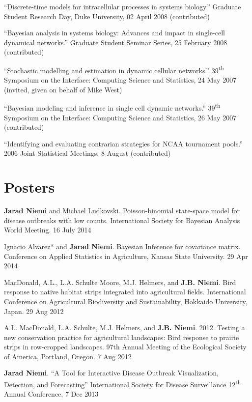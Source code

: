 \documentclass[overlapped,line]{res}
\begin{document}
\begin{resume}
{``Discrete-time models for intracellular processes in systems biology.'' Graduate Student Research Day, Duke University, 02 April 2008 (contributed)

``Bayesian analysis in systems biology: Advances and impact in single-cell dynamical networks.'' Graduate Student Seminar Series, 25 February 2008 (contributed)

``Stochastic modelling and estimation in dynamic cellular networks.'' 39\textsuperscript{th} Symposium on the Interface: Computing Science and Statistics, 24 May 2007 (invited, given on behalf of Mike West)

``Bayesian modeling and inference in single cell dynamic networks.'' 39\textsuperscript{th} Symposium on the Interface: Computing Science and Statistics, 26 May 2007 (contributed)


``Identifying and evaluating contrarian strategies for NCAA tournament pools.'' 2006 Joint Statistical Meetings, 8 August (contributed)

}


\section{\bf Posters}

{\small

{\bf Jarad Niemi} and Michael Ludkovski. Poisson-binomial state-space model for disease outbreaks with low counts. International Society for Bayesian Analysis World Meeting. 16 July 2014 

Ignacio Alvarez* and {\bf Jarad Niemi}. Bayesian Inference for covariance matrix. Conference on Applied Statistics in Agriculture, Kansas State University. 29 Apr 2014 

MacDonald, A.L., L.A. Schulte Moore, M.J. Helmers, and {\bf J.B. Niemi}.  Bird response to native habitat strips integrated into agricultural fields.  International Conference on Agricultural Biodiversity and Sustainability, Hokkaido University, Japan.  29 Aug 2012 

A.L. MacDonald, L.A. Schulte, M.J. Helmers, and {\bf J.B. Niemi}.  2012.  Testing a new conservation practice for agricultural landscapes: Bird response to prairie strips in row-cropped landscapes.  97th Annual Meeting of the Ecological Society of America, Portland, Oregon. 7 Aug 2012 

{\bf Jarad Niemi}. ``A Tool for Interactive Disease Outbreak Visualization, Detection, and Forecasting'' International Society for Disease Surveillance 12\textsuperscript{th} Annual Conference, 7 Dec 2013

}
\end{resume}
\end{document}
